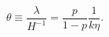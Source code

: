 \begin{equation}\label{eq:theta}
  \theta\equiv\frac{\lambda}{H^{-1}}=\frac{p}{1-p}\frac{1}{k\eta}.
\end{equation}

